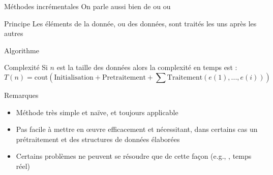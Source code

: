 \documentclass[aspectratio=1610,francais,envcountsect]{beamer}
\begin{document}
\begin{frame}[allowframebreaks]{Méthodes incrémentales}
  On parle aussi bien de  ou
   ou 

  \begin{alertblock}{Principe}
    Les éléments de la donnée, ou des données, sont traités les uns
    après les autres
  \end{alertblock}

  \begin{block}{Algorithme}
    \begin{algorithm}[H]
      \DontPrintSemicolon {}
       \init{}\;
      \preprocess{} 
    \end{algorithm}
  \end{block}

\begin{block}{Complexité}
  Si $n$ est la taille des données alors la complexité en temps est :
  \begin{equation}
    T(n) = \text{cout}(\text{Initialisation} + \text{Pretraitement}+ \sum \text{Traitement}(e(1),...,e(i)))
  \end{equation}
\end{block}

\framebreak

\begin{block}{Remarques}
  \begin{itemize}
  \item Méthode très simple et naïve, et toujours applicable
  \item Pas facile à mettre en œuvre efficacement et nécessitant, dans
    certains cas un prétraitement et des structures de données
    élaborées
  \item Certains problèmes ne peuvent se résoudre que de cette façon
    (e.g., , temps réel)
  \end{itemize}
\end{block}

\framebreak


\end{frame}
\end{document}

